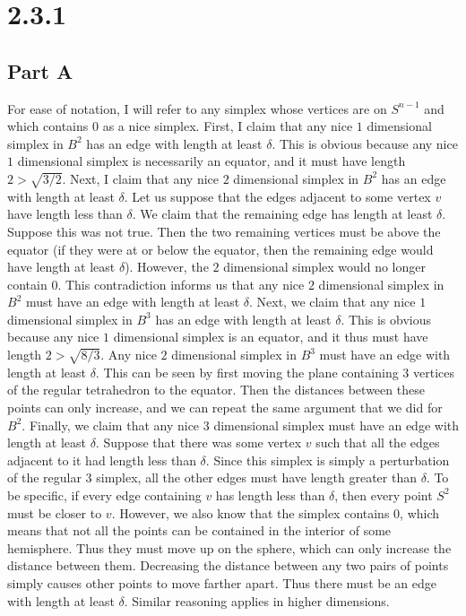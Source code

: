 \documentclass[12pt]{article}
\begin{document}
\section*{2.3.1}
\subsection*{Part A}
For ease of notation, I will refer to any simplex whose vertices are on $S^{n-1}$ and which contains $0$ as a nice simplex. First, I claim that any nice $1$ dimensional simplex in $B^2$ has an edge with length at least $\delta$. This is obvious because any nice $1$ dimensional simplex is necessarily an equator, and it must have length $2 > \sqrt{3/2}$. Next, I claim that any nice $2$ dimensional simplex in $B^2$ has an edge with length at least $\delta$. Let us suppose that the edges adjacent to some vertex $v$ have length less than $\delta$. We claim that the remaining edge has length at least $\delta$. Suppose this was not true. Then the two remaining vertices must be above the equator (if they were at or below the equator, then the remaining edge would have length at least $\delta$).  However, the $2$ dimensional simplex would no longer contain $0$. This contradiction informs us that any nice $2$ dimensional simplex in $B^2$ must have an edge with length at least $\delta$. Next, we claim that any nice $1$ dimensional simplex in $B^3$ has an edge with length at least $\delta$. This is obvious because any nice $1$ dimensional simplex is an equator, and it thus must have length $2 > \sqrt{8/3}$. Any nice $2$ dimensional simplex in $B^3$ must have an edge with length at least $\delta$. This can be seen by first moving the plane containing $3$ vertices of the regular tetrahedron to the equator. Then the distances between these points can only increase, and we can repeat the same argument that we did for $B^2$. Finally, we claim that any nice $3$ dimensional simplex must have an edge with length at least $\delta$. Suppose that there was some vertex $v$ such that all the edges adjacent to it had length less than $\delta$. Since this simplex is simply a perturbation of the regular $3$ simplex, all the other edges must have length greater than $\delta$. To be specific, if every edge containing $v$ has length less than $\delta$, then every point $S^2$ must be closer to $v$. However, we also know that the simplex contains $0$, which means that not all the points can be contained in the interior of some hemisphere. Thus they must move up on the sphere, which can only increase the distance between them. Decreasing the distance between any two pairs of points simply causes other points to move farther apart. Thus there must be an edge with length at least $\delta$. Similar reasoning applies in higher dimensions.
\newpage
\end{document}
